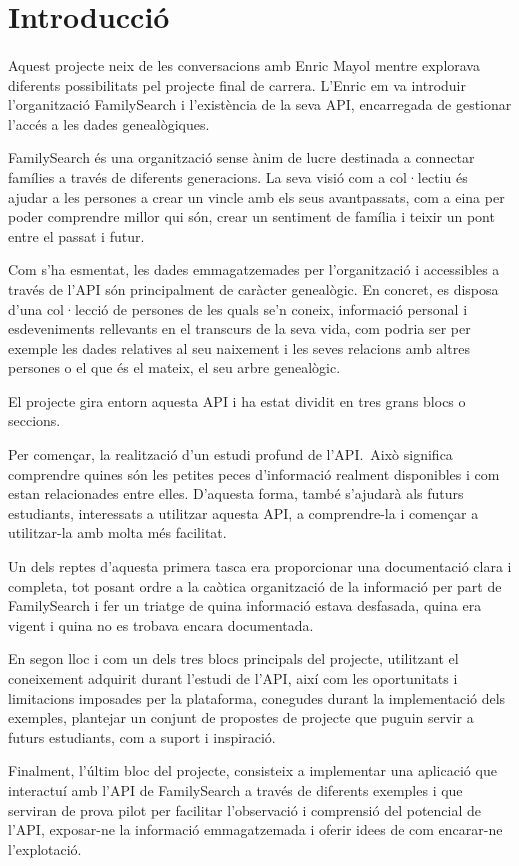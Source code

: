 \section{Introducció}

    \paragraph{}
    Aquest projecte neix de les conversacions amb Enric Mayol mentre explorava di\-fe\-rents possibilitats pel projecte final de carrera. L’Enric em va introduir l'organització FamilySearch i l'existència de la seva \gls{API}, encarregada de gestionar l’accés a les dades genealògiques.

    \gls{FamilySearch} és una organització sense ànim de lucre destinada a connectar famílies a través de diferents generacions. La seva visió com a col·lectiu és ajudar a les persones a crear un vincle amb els seus avantpassats, com a eina per poder comprendre millor qui són, crear un sentiment de família i teixir un pont entre el passat i futur.

    Com s'ha esmentat, les dades emmagatzemades per l'organització i accessibles a través de l'\gls{API} són principalment de caràcter genealògic. En concret, es disposa d'una col·lecció de persones de les quals se'n coneix, informació personal i esdeveniments rellevants en el transcurs de la seva vida, com podria ser per exemple les dades relatives al seu naixement i les seves relacions amb altres persones o el que és el mateix, el seu arbre genealògic.

    El projecte gira entorn aquesta \gls{API} i ha estat dividit en tres grans blocs o seccions.

    Per començar, la realització d'un estudi profund de l'\gls{API}.\ Això significa comprendre quines són les petites peces d’informació realment disponibles i com estan relacionades entre elles. D'aquesta forma, també s'ajudarà als futurs estudiants, interessats a utilitzar aquesta API, a comprendre-la i començar a utilitzar-la amb molta més facilitat.

    Un dels reptes d'aquesta primera tasca era proporcionar una documentació clara i completa, tot posant ordre a la caòtica organització de la informació per part de FamilySearch i fer un triatge de quina informació estava desfasada, quina era vigent i quina no es trobava encara documentada.

    En segon lloc i com un dels tres blocs principals del projecte, utilitzant el conei\-xe\-ment adquirit durant l’estudi de l'\gls{API}, així com les oportunitats i limitacions imposades per la plataforma, conegudes durant la implementació dels exemples, plantejar un conjunt de propostes de projecte que puguin servir a futurs estudiants, com a suport i inspiració.

    Finalment, l’últim bloc del projecte, consisteix a implementar una aplicació que interactuí amb l'\gls{API} de FamilySearch a través de diferents exemples i que serviran de prova pilot per facilitar l'observació i comprensió del potencial de l'\gls{API}, exposar-ne la informació emmagatzemada i oferir idees de com encarar-ne l'explotació.
